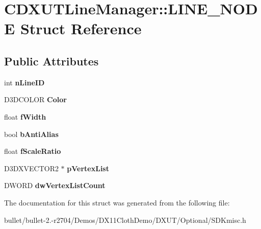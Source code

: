 \hypertarget{struct_c_d_x_u_t_line_manager_1_1_l_i_n_e___n_o_d_e}{\section{C\+D\+X\+U\+T\+Line\+Manager\+:\+:L\+I\+N\+E\+\_\+\+N\+O\+D\+E Struct Reference}
\label{struct_c_d_x_u_t_line_manager_1_1_l_i_n_e___n_o_d_e}
}
\subsection*{Public Attributes}
\begin{DoxyCompactItemize}
\item 
\hypertarget{struct_c_d_x_u_t_line_manager_1_1_l_i_n_e___n_o_d_e_a8688dc63f9f2bf94da6ff1d580debf99}{int {\bfseries n\+Line\+I\+D}}\label{struct_c_d_x_u_t_line_manager_1_1_l_i_n_e___n_o_d_e_a8688dc63f9f2bf94da6ff1d580debf99}

\item 
\hypertarget{struct_c_d_x_u_t_line_manager_1_1_l_i_n_e___n_o_d_e_ac5eb34ee677c6233a271904320ab5cc6}{D3\+D\+C\+O\+L\+O\+R {\bfseries Color}}\label{struct_c_d_x_u_t_line_manager_1_1_l_i_n_e___n_o_d_e_ac5eb34ee677c6233a271904320ab5cc6}

\item 
\hypertarget{struct_c_d_x_u_t_line_manager_1_1_l_i_n_e___n_o_d_e_aeaff8df971cd783d13902dbd4297d095}{float {\bfseries f\+Width}}\label{struct_c_d_x_u_t_line_manager_1_1_l_i_n_e___n_o_d_e_aeaff8df971cd783d13902dbd4297d095}

\item 
\hypertarget{struct_c_d_x_u_t_line_manager_1_1_l_i_n_e___n_o_d_e_a5afd5e9697e25b5a2a27aaa5943ce683}{bool {\bfseries b\+Anti\+Alias}}\label{struct_c_d_x_u_t_line_manager_1_1_l_i_n_e___n_o_d_e_a5afd5e9697e25b5a2a27aaa5943ce683}

\item 
\hypertarget{struct_c_d_x_u_t_line_manager_1_1_l_i_n_e___n_o_d_e_a04167bd21ca4aa7480780e6ded9daa25}{float {\bfseries f\+Scale\+Ratio}}\label{struct_c_d_x_u_t_line_manager_1_1_l_i_n_e___n_o_d_e_a04167bd21ca4aa7480780e6ded9daa25}

\item 
\hypertarget{struct_c_d_x_u_t_line_manager_1_1_l_i_n_e___n_o_d_e_a2932a50dd89ddd73d3cd6964e0aec83e}{D3\+D\+X\+V\+E\+C\+T\+O\+R2 $\ast$ {\bfseries p\+Vertex\+List}}\label{struct_c_d_x_u_t_line_manager_1_1_l_i_n_e___n_o_d_e_a2932a50dd89ddd73d3cd6964e0aec83e}

\item 
\hypertarget{struct_c_d_x_u_t_line_manager_1_1_l_i_n_e___n_o_d_e_a1cca2772a871388faee3fd3e544babee}{D\+W\+O\+R\+D {\bfseries dw\+Vertex\+List\+Count}}\label{struct_c_d_x_u_t_line_manager_1_1_l_i_n_e___n_o_d_e_a1cca2772a871388faee3fd3e544babee}

\end{DoxyCompactItemize}


The documentation for this struct was generated from the following file\+:\begin{DoxyCompactItemize}
\item 
bullet/bullet-\/2.-\/r2704/\+Demos/\+D\+X11\+Cloth\+Demo/\+D\+X\+U\+T/\+Optional/S\+D\+Kmisc.\+h\end{DoxyCompactItemize}
